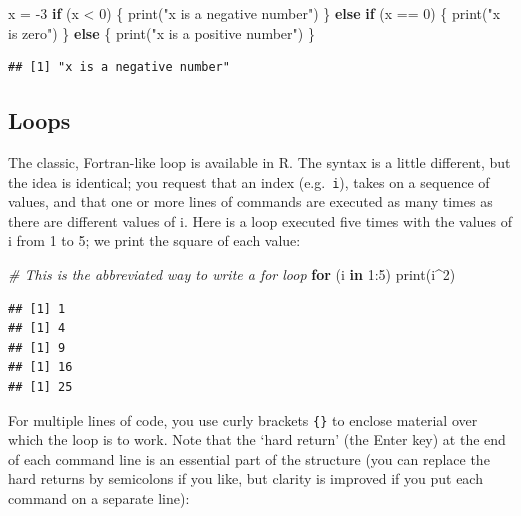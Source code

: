 \documentclass[
]{book}
\newenvironment{Shaded}{\begin{snugshade}}{\end{snugshade}}
\newcommand{\CommentTok}[1]{\textcolor[rgb]{0.56,0.35,0.01}{\textit{#1}}}
\newcommand{\ControlFlowTok}[1]{\textcolor[rgb]{0.13,0.29,0.53}{\textbf{#1}}}
\newcommand{\DecValTok}[1]{\textcolor[rgb]{0.00,0.00,0.81}{#1}}
\newcommand{\FunctionTok}[1]{\textcolor[rgb]{0.00,0.00,0.00}{#1}}
\newcommand{\NormalTok}[1]{#1}
\newcommand{\OtherTok}[1]{\textcolor[rgb]{0.56,0.35,0.01}{#1}}
\newcommand{\SpecialCharTok}[1]{\textcolor[rgb]{0.00,0.00,0.00}{#1}}
\newcommand{\StringTok}[1]{\textcolor[rgb]{0.31,0.60,0.02}{#1}}
\theoremstyle{definition}
\theoremstyle{definition}
\theoremstyle{definition}
\theoremstyle{definition}
\theoremstyle{remark}
\begin{document}
\begin{Shaded}
\begin{Highlighting}[]
\NormalTok{x }\OtherTok{=} \SpecialCharTok{{-}}\DecValTok{3}
\ControlFlowTok{if}\NormalTok{ (x }\SpecialCharTok{\textless{}} \DecValTok{0}\NormalTok{) \{}
  \FunctionTok{print}\NormalTok{(}\StringTok{"x is a negative number"}\NormalTok{)}
\NormalTok{\} }\ControlFlowTok{else} \ControlFlowTok{if}\NormalTok{ (x }\SpecialCharTok{==} \DecValTok{0}\NormalTok{) \{}
  \FunctionTok{print}\NormalTok{(}\StringTok{"x is zero"}\NormalTok{)}
\NormalTok{\} }\ControlFlowTok{else}\NormalTok{ \{}
  \FunctionTok{print}\NormalTok{(}\StringTok{"x is a positive number"}\NormalTok{)}
\NormalTok{\}}
\end{Highlighting}
\end{Shaded}

\begin{verbatim}
## [1] "x is a negative number"
\end{verbatim}

\hypertarget{loops}{%
\subsection{Loops}\label{loops}}

The classic, Fortran-like loop is available in R. The syntax is a little different, but the idea is identical; you request that an index (e.g.~\texttt{i}), takes on a sequence of values, and that one or more lines of commands are executed as many times as there are different values of i. Here is a loop executed five times with the values of i from 1 to 5; we print the square of each value:

\begin{Shaded}
\begin{Highlighting}[]
\CommentTok{\# This is the abbreviated way to write a for loop}
\ControlFlowTok{for}\NormalTok{ (i }\ControlFlowTok{in} \DecValTok{1}\SpecialCharTok{:}\DecValTok{5}\NormalTok{) }\FunctionTok{print}\NormalTok{(i}\SpecialCharTok{\^{}}\DecValTok{2}\NormalTok{)}
\end{Highlighting}
\end{Shaded}

\begin{verbatim}
## [1] 1
## [1] 4
## [1] 9
## [1] 16
## [1] 25
\end{verbatim}

For multiple lines of code, you use curly brackets \texttt{\{\}} to enclose material over which the loop is to work. Note that the `hard return' (the Enter key) at the end of each command line is an essential part of the structure (you can replace the hard returns by semicolons if you like, but clarity is improved if you put each command on a separate line):
\end{document}
